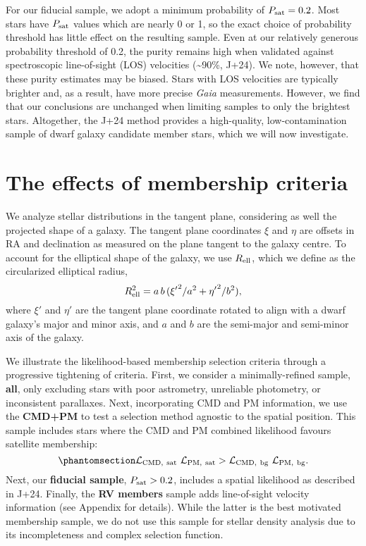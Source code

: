 For our fiducial sample, we adopt a minimum probability of
\(P_{\rm sat} = 0.2\). Most stars have \(P_{\rm  sat}\) values which are
nearly 0 or 1, so the exact choice of probability threshold has little
effect on the resulting sample. Even at our relatively generous
probability threshold of 0.2, the purity remains high when validated
against spectroscopic line-of-sight (LOS) velocities
(\textasciitilde90\%, J+24). We note, however, that these purity
estimates may be biased. Stars with LOS velocities are typically
brighter and, as a result, have more precise \emph{Gaia} measurements.
However, we find that our conclusions are unchanged when limiting
samples to only the brightest stars. Altogether, the J+24 method
provides a high-quality, low-contamination sample of dwarf galaxy
candidate member stars, which we will now investigate.

\section{The effects of membership
criteria}\label{the-effects-of-membership-criteria}

We analyze stellar distributions in the tangent plane, considering as
well the projected shape of a galaxy. The tangent plane coordinates
\(\xi\) and \(\eta\) are offsets in RA and declination as measured on
the plane tangent to the galaxy centre. To account for the elliptical
shape of the galaxy, we use \(R_{\rm ell}\), which we define as the
circularized elliptical radius, \begin{equation}{
R_{\rm ell}^2 = a\,b\,({\xi'}^2 / a^2 + {\eta'}^2 / b^2),
}\end{equation} where \(\xi'\) and \(\eta'\) are the tangent plane
coordinate rotated to align with a dwarf galaxy's major and minor axis,
and \(a\) and \(b\) are the semi-major and semi-minor axis of the
galaxy.

We illustrate the likelihood-based membership selection criteria through
a progressive tightening of criteria. First, we consider a
minimally-refined sample, \textbf{all}, only excluding stars with poor
astrometry, unreliable photometry, or inconsistent parallaxes. Next,
incorporating CMD and PM information, we use the \textbf{CMD+PM} to test
a selection method agnostic to the spatial position. This sample
includes stars where the CMD and PM combined likelihood favours
satellite membership:
\begin{equation}\protect\phantomsection\label{eq:sel_cmd_pm}{
{\cal L}_{\rm CMD,\ sat}\ {\cal L}_{\rm PM,\ sat} > {\cal L}_{\rm CMD,\ bg}\ {\cal L}_{\rm PM,\ bg}.
}\end{equation} Next, our \textbf{fiducial sample},
\(P_{\rm sat} > 0.2\), includes a spatial likelihood as described in
J+24. Finally, the \textbf{RV members} sample adds line-of-sight
velocity information (see Appendix for details). While the latter is the
best motivated membership sample, we do not use this sample for stellar
density analysis due to its incompleteness and complex selection
function.

